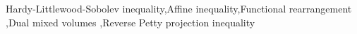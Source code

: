 \documentclass[preprint,12pt]{elsarticle}
\begin{document}
\begin{frontmatter}


\begin{keyword}
Hardy-Littlewood-Sobolev inequality\sep Affine inequality\sep Functional rearrangement \sep Dual mixed volumes \sep Reverse Petty projection inequality



\end{keyword}

\end{frontmatter}


\end{document}
